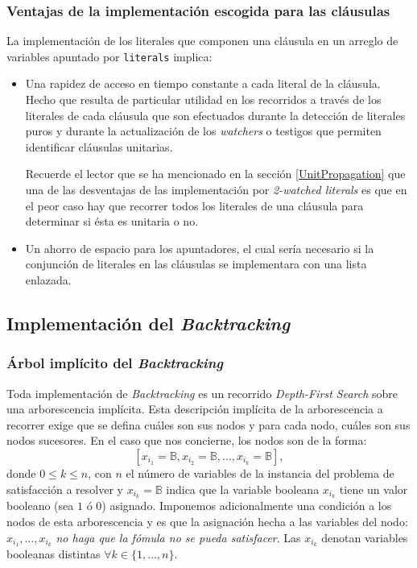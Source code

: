 \documentclass[12pt,lettersize,oneside]{article}
\begin{document}
\subsubsection{Ventajas de la implementación escogida para las cláusulas}
La implementación de los literales que componen una cláusula en un arreglo de
variables apuntado por {\tt literals} implica: \vspace{-2.5mm}
\begin{itemize}
\item Una rapidez de acceso en tiempo constante a cada literal de la
  cláusula. Hecho que resulta de particular utilidad en los recorridos a través
  de los literales de cada cláusula que son efectuados durante la detección de
  literales puros y durante la actualización de los \emph{watchers} o testigos
  que permiten identificar cláusulas unitarias. 

  Recuerde el lector que se ha mencionado en la sección \ref{UnitPropagation} que
  una de las desventajas de las implementación por \emph{2-watched literals} es
  que en el peor caso hay que recorrer todos los literales de una cláusula para
  determinar si ésta es unitaria o no.

\item Un ahorro de espacio para los apuntadores, el cual sería necesario si la
  conjunción de literales en las cláusulas se implementara con una lista
  enlazada.
\end{itemize}

\subsection{Implementación del \emph{Backtracking}}
\subsubsection{\'Arbol implícito del \emph{Backtracking}}\label{backtracking}
Toda implementación de \emph{Backtracking} es un recorrido \emph{Depth-First
  Search} sobre una arborescencia implícita. Esta descripción implícita de la
arborescencia a recorrer exige que se defina cuáles son sus nodos y para cada
nodo, cuáles son sus nodos sucesores. En el caso que nos concierne, los nodos
son de la forma:
\[[x_{i_1}=\mathbb{B},x_{i_2}=\mathbb{B},\ldots, x_{i_k} = \mathbb{B} ], \]
donde $0\leq k \leq n$, con $n$ el número de variables de la instancia del
problema de satisfacción a resolver y $x_{i_k}=\mathbb{B}$ indica que la
variable booleana $x_{i_k}$ tiene un valor booleano (sea $1$ ó $0$)
asignado. Imponemos adicionalmente una condición a los nodos de esta
arborescencia y es que la asignación hecha a las variables del nodo:
$x_{i_1},\ldots,x_{i_k}$ \emph{no haga que la fómula no se pueda
  satisfacer}. Las $x_{i_k}$ denotan variables booleanas distintas $\forall k
\in \{1,\ldots,n\}$.
\end{document}

